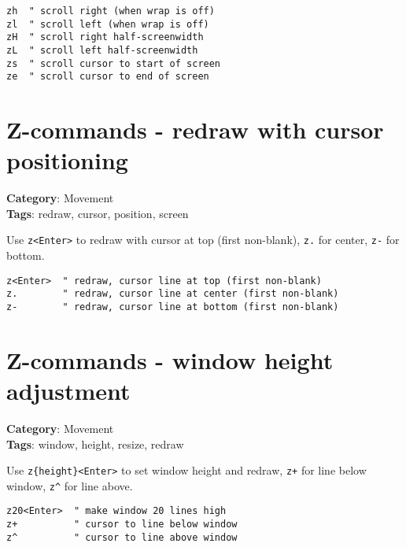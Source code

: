 {{{{{{{{\begin{Exa*}{}
\begin{Verbatim}[fontsize=\footnotesize, breaklines, breakanywhere]
zh  " scroll right (when wrap is off)
zl  " scroll left (when wrap is off)
zH  " scroll right half-screenwidth
zL  " scroll left half-screenwidth
zs  " scroll cursor to start of screen
ze  " scroll cursor to end of screen
\end{Verbatim}
\end{Exa*}

\section{Z-commands - redraw with cursor positioning}

\textbf{Category}: Movement\\ \textbf{Tags}: redraw, cursor, position, screen
\vspace{0.5cm}

Use {\footnotesize \Verb§z<Enter>§} to redraw with cursor at top (first non-blank), {\footnotesize \Verb§z.§} for center, {\footnotesize \Verb§z-§} for bottom.

\begin{Exa*}{}
\begin{Verbatim}[fontsize=\footnotesize, breaklines, breakanywhere]
z<Enter>  " redraw, cursor line at top (first non-blank)
z.        " redraw, cursor line at center (first non-blank)  
z-        " redraw, cursor line at bottom (first non-blank)
\end{Verbatim}
\end{Exa*}

\section{Z-commands - window height adjustment}

\textbf{Category}: Movement\\ \textbf{Tags}: window, height, resize, redraw
\vspace{0.5cm}

Use {\footnotesize \Verb§z{height}<Enter>§} to set window height and redraw, {\footnotesize \Verb§z+§} for line below window, {\footnotesize \Verb§z^§} for line above.

\begin{Exa*}{}
\begin{Verbatim}[fontsize=\footnotesize, breaklines, breakanywhere]
z20<Enter>  " make window 20 lines high
z+          " cursor to line below window
z^          " cursor to line above window
\end{Verbatim}
\end{Exa*}

}}}}}}}}
